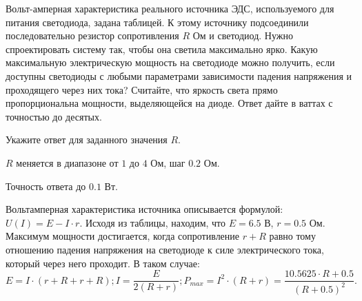 
Вольт-амперная характеристика реального источника ЭДС, используемого для питания
светодиода, задана таблицей. К этому источнику подсоединили последовательно резистор
сопротивления $R$ Ом и светодиод. Нужно спроектировать систему так, чтобы она светила максимально ярко. Какую
максимальную электрическую мощность на светодиоде можно получить, если доступны светодиоды с любыми параметрами зависимости падения напряжения и проходящего
через них тока? Считайте, что яркость света прямо пропорциональна мощности, выделяющейся на диоде. Ответ дайте в ваттах с точностью до десятых.


Укажите ответ для заданного значения $R$.

\paramSection

$R$ меняется в диапазоне от $1$ до $4$ Ом, шаг $0.2$ Ом. 

Точность ответа до $0.1$ Вт.

\solutionSection

Вольтамперная характеристика источника описывается формулой: \linebreak $U(I)=E-I \cdot r$.
Исходя из таблицы, находим, что $E = 6.5$ В, $r = 0.5$ Ом. Максимум мощности достигается, 
когда сопротивление $r+R$ равно тому отношению падения напряжения на светодиоде к силе 
электрического тока, который через него проходит. В таком случае:
$$E=I \cdot (r+R+r+R);  I=\frac{E}{2(R+r)}; P_{max}=I^2 \cdot (R+r) = \frac{10.5625 \cdot R + 0.5}{(R +0.5)^2}.$$

